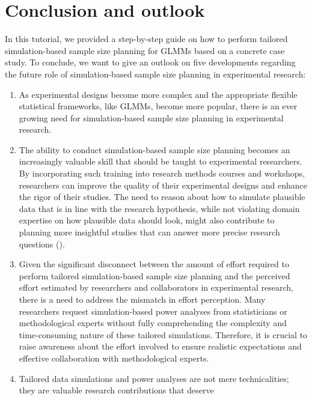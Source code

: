 \documentclass[
  man,
  floatsintext,
  longtable,
  a4paper,
  nolmodern,
  notxfonts,
  notimes,
  colorlinks=true,linkcolor=blue,citecolor=blue,urlcolor=blue]{apa7}
\begin{document}
\section{Conclusion and outlook}\label{conclusion-and-outlook}

In this tutorial, we provided a step-by-step guide on how to perform
tailored simulation-based sample size planning for GLMMs based on a
concrete case study. To conclude, we want to give an outlook on five
developments regarding the future role of simulation-based sample size
planning in experimental research:

\begin{enumerate}
\def\labelenumi{\arabic{enumi}.}
\item
  As experimental designs become more complex and the appropriate
  flexible statistical frameworks, like GLMMs, become more popular,
  there is an ever growing need for simulation-based sample size
  planning in experimental research.
\item
  The ability to conduct simulation-based sample size planning becomes
  an increasingly valuable skill that should be taught to experimental
  researchers. By incorporating such training into research methods
  courses and workshops, researchers can improve the quality of their
  experimental designs and enhance the rigor of their studies. The need
  to reason about how to simulate plausible data that is in line with
  the research hypothesis, while not violating domain expertise on how
  plausible data should look, might also contribute to planning more
  insightful studies that can answer more precise research questions
  ().
\item
  Given the significant disconnect between the amount of effort required
  to perform tailored simulation-based sample size planning and the
  perceived effort estimated by researchers and collaborators in
  experimental research, there is a need to address the mismatch in
  effort perception. Many researchers request simulation-based power
  analyses from statisticians or methodological experts without fully
  comprehending the complexity and time-consuming nature of these
  tailored simulations. Therefore, it is crucial to raise awareness
  about the effort involved to ensure realistic expectations and
  effective collaboration with methodological experts.
\item
  Tailored data simulations and power analyses are not mere
  technicalities; they are valuable research contributions that deserve

\end{enumerate}
\end{document}
